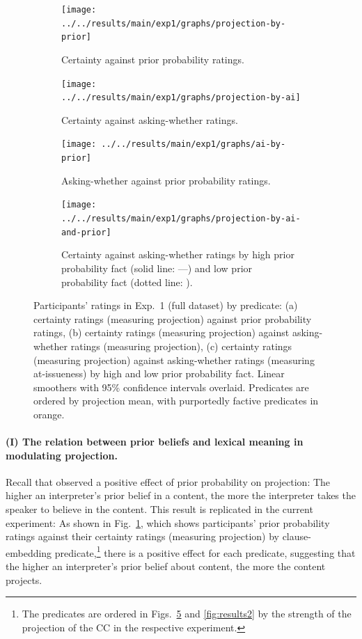 \documentclass[11pt,fleqn]{article}
\newcommand{\6}{\mbox{$[\hspace*{-.6mm}[$}}
\newcommand{\9}{\mbox{$]\hspace*{-.6mm}]$}}
\begin{document}
\begin{figure}[h!]
\centering
\begin{subfigure}[t]{0.49\textwidth}
\centering
\texttt{[image: ../../results/main/exp1/graphs/projection-by-prior]}
\caption{Certainty against prior probability ratings.}\label{fig:certainty-by-prior}
\end{subfigure} \hfill \begin{subfigure}[t]{0.49\textwidth}
\centering
\texttt{[image: ../../results/main/exp1/graphs/projection-by-ai]}
\caption{Certainty against asking-whether ratings.}\label{fig:certainty-by-nai}
 \end{subfigure}
 
\begin{subfigure}[t]{0.49\textwidth}
\centering
\texttt{[image: ../../results/main/exp1/graphs/ai-by-prior]}
\caption{Asking-whether against prior probability ratings.}\label{fig:ai-by-prior}
\end{subfigure} \hfill 
\begin{subfigure}[t]{0.49\textwidth}
\centering
\texttt{[image: ../../results/main/exp1/graphs/projection-by-ai-and-prior]}
\caption{Certainty against asking-whether ratings by high prior probability fact (solid line: ---) and low prior probability fact (dotted line: \raisebox{1mm}{\ldots}).}\label{fig:certainty-by-ai-and-prior}
 \end{subfigure}
  
\caption{Participants' ratings in Exp.~1 (full dataset) by predicate: (a) certainty ratings (measuring projection) against prior probability ratings, (b) certainty ratings (measuring projection) against asking-whether ratings (measuring projection), (c) certainty ratings (measuring projection) against asking-whether ratings (measuring at-issueness) by high and low prior probability fact. Linear smoothers with 95\% confidence intervals overlaid. Predicates are ordered by projection mean, with purportedly factive predicates in orange.}\label{fig:results1}
\end{figure}

\paragraph{(I) The relation between prior beliefs and lexical meaning in modulating projection.} Recall that \citealt{degen-tonhauser-openmind} observed a positive effect of prior probability on projection: The higher an interpreter's prior belief in a content, the more the interpreter takes the speaker to believe in the content. This result is replicated in the current experiment: As shown in Fig.~\ref{fig:certainty-by-prior}, which shows participants' prior probability ratings against their certainty ratings (measuring projection) by clause-embedding predicate,\footnote{The predicates are ordered in Figs.~\ref{fig:results1} and \ref{fig:results2} by the strength of the projection of the CC in the respective experiment.} there is a positive effect for each predicate, suggesting that the higher an interpreter's prior belief about content, the more the content projects.
\end{document}
